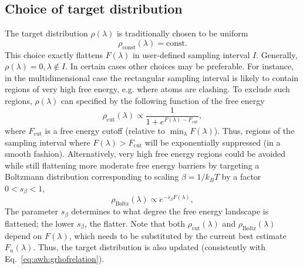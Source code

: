 \subsection{Choice of target distribution}\label{sec:awh:targets}
The target distribution $\rho(\lambda)$ is traditionally chosen to be uniform
\begin{equation}
\rho_{\mathrm{const}}(\lambda) = \mathrm{const.}
\end{equation}
This choice exactly flattens $F(\lambda)$ in  user-defined sampling interval $I$.
Generally, $\rho(\lambda)=0, \lambda\notin I$.
In certain cases other choices may be preferable.
For instance, in the multidimensional case  the  rectangular sampling interval is likely to
contain regions of very high free energy, e.g. where  atoms are clashing.
To exclude such regions, $\rho(\lambda)$ can specified by the following function of the free energy
\begin{equation}\label{eq:awh:rhocut}
\rho_{\mathrm{cut}}(\lambda) \propto \frac{1}{1+ e^{F(\lambda) - F_{\mathrm{cut}}}}, %
\end{equation}
where $F_{\mathrm{cut}}$ is a  free energy cutoff  (relative to $\min_\lambda F(\lambda)$).
Thus, regions of the sampling interval where
$F(\lambda) > F_{\mathrm{cut}}$ will  be exponentially suppressed (in a smooth fashion).
Alternatively, very high free energy regions could be avoided while still flattening more moderate free energy barriers
by targeting a Boltzmann distribution corresponding to scaling $\beta=1/k_BT$ by  a factor  $0<s_\beta<1$,
\begin{equation}\label{eq:awh:rhoboltz}
\rho_{\mathrm{Boltz}}(\lambda) \propto e^{-s_\beta F(\lambda)}, %
\end{equation}
The parameter $s_\beta$ determines to what degree the free energy landscape is flattened;
the lower $s_\beta$, the flatter.
Note that both $\rho_{\mathrm{cut}}(\lambda)$ and $\rho_{\mathrm{Boltz}}(\lambda)$
depend on  $F(\lambda)$, which needs to be substituted by the current best estimate $F_n(\lambda)$.
Thus,  the target distribution is also updated (consistently with  Eq.~\ref{eq:awh:grhofrelation}).

